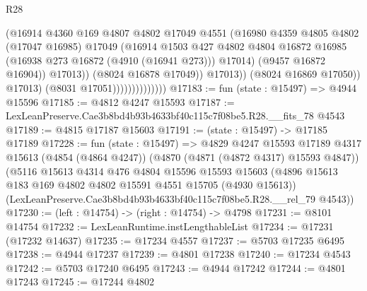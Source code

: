 \begin{lexlean}{R28}
\begin{coremodule}
                                          (@16914
                                            @4360
                                            @169
                                            @4807
                                            @4802
                                            @17049
                                            @4551
                                            (@16980
                                              @4359
                                              @4805
                                              @4802
                                              (@17047 @16985)
                                              @17049
                                              (@16914
                                                @1503
                                                @427
                                                @4802
                                                @4804
                                                @16872
                                                @16985
                                                (@16938 @273 @16872 (@4910 (@16941 @273)))
                                                @17014)
                                              (@9457 @16872 @16904))
                                            @17013))
                                        (@8024 @16878 @17049))
                                      @17013))
                                  (@8024 @16869 @17050))
                                @17013)
                              (@8031 @17051))))))))))))))
@17183 := fun (state : @15497) => @4944 @15596
@17185 := @4812 @4247 @15593
@17187 := LexLeanPreserve.Cae3b8bd4b93b4633bf40c115c7f08be5.R28.__fits_78 @4543
@17189 := @4815 @17187 @15603
@17191 := (state : @15497) -> @17185 @17189
@17228 := fun (state : @15497) =>
  @4829
    @4247
    @15593
    @17189
    @4317
    @15613
    (@4854 (@4864 @4247))
    (@4870 (@4871 (@4872 @4317) @15593 @4847))
    (@5116
      @15613
      @4314
      @476
      @4804
      @15596
      @15593
      @15603
      (@4896 @15613 @183 @169 @4802 @4802 @15591 @4551 @15705 (@4930 @15613))
      (LexLeanPreserve.Cae3b8bd4b93b4633bf40c115c7f08be5.R28.__rel_79 @4543))
@17230 := (left : @14754) -> (right : @14754) -> @4798
@17231 := @8101 @14754
@17232 := LexLeanRuntime.instLengthableList
@17234 := @17231 (@17232 @14637)
@17235 := @17234 @4557
@17237 := @5703 @17235 @6495
@17238 := @4944 @17237
@17239 := @4801 @17238
@17240 := @17234 @4543
@17242 := @5703 @17240 @6495
@17243 := @4944 @17242
@17244 := @4801 @17243
@17245 := @17244 @4802

\end{coremodule}
\end{lexlean}
